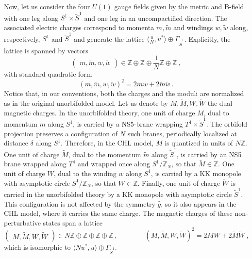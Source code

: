 \documentclass[a4paper,11pt]{article}
\newcommand{\ZZ}{\mathbb{Z}}
\numberwithin{equation}{section}
\def\be{\begin{equation}}
\def\ee{\end{equation}}
\begin{document}

Now, let us consider the four $U(1)$ gauge fields given by the metric and B-field with one leg along $S^1\times \tilde S^1$ and one leg in an uncompactified direction. The associated electric charges correspond to momenta $m,\tilde m$ and windings $w,\tilde w$ along, respectively, $S^1$ and $\tilde S^1$ and generate the lattice $\langle \frac{u}{N}, u^*\rangle \oplus \Gamma_{\tilde S^1}$. Explicitly, the lattice is spanned by vectors
\be  (\begin{matrix}
m, \tilde m , w , \tilde w
\end{matrix})\in \ZZ\oplus \ZZ\oplus \frac{1}{N}\ZZ\oplus \ZZ\ ,\ee
with standard quadratic form
\be\label{quadform} (m,\tilde m,w,\tilde w)^2=2mw+2\tilde m\tilde w\ . \ee
 Notice that,  in our conventions, both the charges and the moduli are normalized as in the original unorbifolded model.
Let us denote by $M,\tilde M,W,\tilde W$ the dual magnetic charges. 
 In the unorbifolded theory, one unit of charge $M$, dual to momentum $m$ along $S^1$, is carried by a NS5-brane wrapping $T^4\times \tilde S^1$. The orbifold projection preserves a configuration of $N$ such branes, periodically localized at distance $\delta$ along $S^1$. Therefore, in the CHL model, $M$ is quantized in units of $N\ZZ$. One unit of charge $\tilde M$, dual to the momentum $\tilde m$ along $\tilde S^1$, is carried by an NS5 brane wrapped along $T^4$ and wrapped once along $S^1/\ZZ_N$, so that $\tilde M\in \ZZ$. One unit of charge $W$, dual to the winding $w$ along $S^1$, is carried by a KK monopole with asymptotic circle $S^1/\ZZ_N$, so that $W\in \ZZ$. Finally, one unit of charge $\tilde W$ is carried in the unorbifolded theory by a KK monopole with asymptotic circle $\tilde S^1$. This configuration is not affected by the symmetry $\hat g$, so it also appears in the CHL model, where it carries the same charge. The magnetic charges of these non-perturbative states span a lattice
\be  (\begin{matrix}
M , \tilde M , W , \tilde W
\end{matrix})\in N\ZZ\oplus \ZZ\oplus \ZZ\oplus \ZZ\ ,\qquad \qquad (M , \tilde M , W , \tilde W)^2=2MW+2\tilde M\tilde W\ ,\ee 
which is isomorphic to  $\langle N u^*, u\rangle \oplus \Gamma_{\tilde S^1}$.
 
\end{document}
